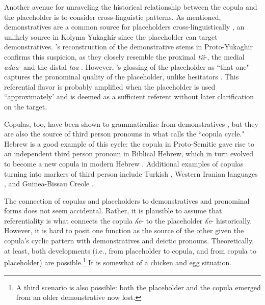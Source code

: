 \documentclass[output=paper,colorlinks,citecolor=brown
\ChapterDOI{10.5281/zenodo.15697581}
]{langscibook}
\begin{document}

Another avenue for unraveling the historical relationship between the copula and the placeholder is to consider cross-linguistic patterns.
As mentioned, demonstratives are a common source for placeholders cross-linguistically \citep{Hayashi&Yoon2010, Podlesskaya2010}, an unlikely source in Kolyma Yukaghir since the placeholder can target demonstratives.
\citet[54]{Nikolaeva2020}'s reconstruction of the demonstrative stems in Proto-Yukaghir confirms this suspicion, as they closely resemble the proximal \textit{tii}-, the medial \textit{adaa}- and the distal \textit{taa}-. 
However, \citet{Nagasaki2010}'s glossing of the placeholder as ``that one" captures the pronominal quality of the placeholder, unlike hesitators \citep{Hayashi&Yoon2010}. 
This referential flavor is probably amplified when the placeholder is used ``approximately' \citep{Podlesskaya2010} and is deemed as a sufficient referent without later clarification on the target.

Copulas, too, have been shown to grammaticalize from demonstratives \citep{Kuteva-etal2019}, but they are also the source of third person pronouns in what \citet{Katz1996} calls the ``copula cycle."
Hebrew is a good example of this cycle: the copula in Proto-Semitic gave rise to an independent third person pronoun in Biblical Hebrew, which in turn evolved to become a new copula in modern Hebrew \citep{Katz1996}. 
Additional examples of copulas turning into markers of third person include Turkish \citep{Katz1996}, Western Iranian languages \citep{Korn2011}, and Guinea-Bissau Creole \citep{Truppi2021}.

The connection of copulas and placeholders to demonstratives and pronominal forms does not seem accidental.
Rather, it is plausible to assume that referentiality is what connects the copula \textit{ʎe}- to the placeholder \textit{ʎe}- historically.
However, it is hard to posit one function as the source of the other given the copula's cyclic pattern with demonstratives and deictic pronouns. 
Theoretically, at least, both developments (i.e., from placeholder to copula, and from copula to placeholder) are possible.\footnote{A third scenario is also possible: both the placeholder and the copula emerged from an older demonstrative now lost.} 
It is somewhat of a chicken and egg situation. 
\end{document}
